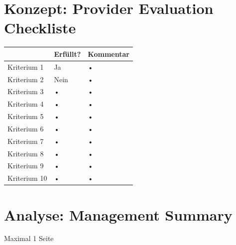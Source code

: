\chapter{Konzept: Provider Evaluation Checkliste}
\begin{table}[H]
\begin{tabular}{|p{}|l|p{}|}
\hline 
 & Erfüllt? & Kommentar \\ 
\hline 
Kriterium 1 & Ja & • \\ 
\hline 
Kriterium 2 & Nein & • \\ 
\hline 
Kriterium 3 & • & • \\ 
\hline 
Kriterium 4 & • & • \\ 
\hline 
Kriterium 5 & • & • \\ 
\hline 
Kriterium 6 & • & • \\ 
\hline 
Kriterium 7 & • & • \\ 
\hline 
Kriterium 8 & • & • \\ 
\hline 
Kriterium 9 & • & • \\ 
\hline 
Kriterium 10 & • & • \\ 
\hline 
\end{tabular} 
\end{table}

\chapter{Analyse: Management Summary}
Maximal 1 Seite

